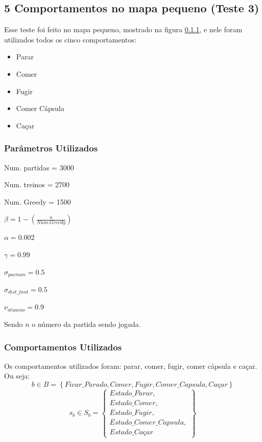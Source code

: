 \subsection{5 Comportamentos no mapa pequeno (Teste 3)} \label{subsection:5ComportamentosMapaPequeno}

Esse teste foi feito no mapa pequeno, mostrado na figura \ref{}, e nele foram utilizados todos os cinco comportamentos:

\begin{itemize}
	\item Parar
	\item Comer
	\item Fugir
	\item Comer Cápsula
	\item Caçar
\end{itemize}

\subsubsection{Parâmetros Utilizados}

\begin{multicols}{2}

Num. partidas = 3000

Num. treinos = 2700

Num. Greedy = 1500

$ \beta = 1 - \left( \frac{n}{Num. Greedy} \right) $

$ \alpha = 0.002 $

$ \gamma = 0.99 $

$ \sigma_{pacman} = 0.5 $

$ \sigma_{dist\_fant} = 0.5 $

$ \nu_{atuacao} = 0.9 $

\end{multicols}

Sendo $ n $ o número da partida sendo jogada.


\subsubsection{Comportamentos Utilizados} \label{subsubsection:5ComportamentosUtilizados}

Os comportamentos utilizados foram: parar, comer, fugir, comer cápsula e caçar. Ou seja:
$$ b \in B = \left\{ Ficar\_Parado, Comer, Fugir, Comer\_Capsula, \textit{Caçar} \right\} $$
$$ s_b \in S_b = 
        \left\{
            \begin{array}{l}
                Estado\_Parar, \\
                Estado\_Comer, \\
                Estado\_Fugir, \\
                Estado\_Comer\_Capsula, \\
                \textit{Estado\_Caçar}
            \end{array}
        \right\}
         $$

